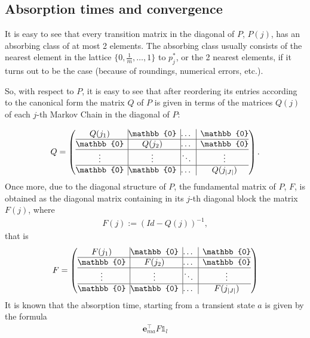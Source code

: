 \documentclass{article}
\newcommand{\e}{\mathbf{e}}
\begin{document}
\subsection*{Absorption times and convergence}
It is easy to see that every transition matrix in the diagonal of $P$, $P(j)$, has an absorbing class of at most 2 elements. The absorbing class usually consists of the nearest element in the lattice $\{0,\frac{1}{m}, \dots, 1\}$ to $p^*_j$, or the 2 nearest elements, if it turns out to be the case (because of roundings, numerical errors, etc.).\par
So, with respect to $P$, it is easy to see that after reordering its entries according to the canonical form the matrix $Q$ of $P$ is given in terms of the matrices $Q(j)$ of each $j$-th Markov Chain in the diagonal of $P$:

\begin{align*}
	Q =
	\left( \begin{array}{@{}c|@{}c|@{}c|c@{}}
		Q(j_1) & \mathbb{0} & \dots & \mathbb{0}\\
		\hline
		\mathbb{0} & Q(j_2) & \dots & \mathbb{0}\\
		\hline
		\vdots & \vdots & \ddots & \vdots\\
		\hline
		\mathbb{0} & \mathbb{0} & \dots & Q(j_{|J|})\\
	\end{array}	\right).
\end{align*}
Once more, due to the diagonal structure of $P$, the fundamental matrix of $P$, $F$, is obtained as the diagonal matrix containing in its $j$-th diagonal block the matrix $F(j)$, where
\begin{align*}
	F(j) := (Id - Q(j))^{-1},
\end{align*}
that is
\begin{align*}
	F =
	\left( \begin{array}{@{}c|@{}c|@{}c|c@{}}
		F(j_1) & \mathbb{0} & \dots & \mathbb{0}\\
		\hline
		\mathbb{0} & F(j_2) & \dots & \mathbb{0}\\
		\hline
		\vdots & \vdots & \ddots & \vdots\\
		\hline
		\mathbb{0} & \mathbb{0} & \dots & F(j_{|J|})\\
	\end{array}	\right)
\end{align*}
It is known that the absorption time, starting from a transient state $a$ is given by the formula
\begin{align*}
	\e_{ma}^{\top} F\mathbb{1}_l
\end{align*}
\end{document}
